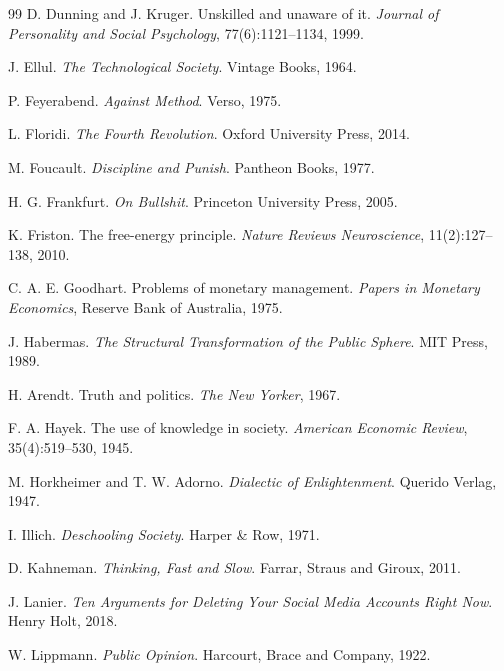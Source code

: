 \documentclass[12pt]{article}
\begin{document}
\begin{thebibliography}{99}
D. Dunning and J. Kruger.
\newblock Unskilled and unaware of it.
\newblock \emph{Journal of Personality and Social Psychology}, 77(6):1121--1134, 1999.

J. Ellul.
\newblock \emph{The Technological Society}.
\newblock Vintage Books, 1964.

P. Feyerabend.
\newblock \emph{Against Method}.
\newblock Verso, 1975.

L. Floridi.
\newblock \emph{The Fourth Revolution}.
\newblock Oxford University Press, 2014.

M. Foucault.
\newblock \emph{Discipline and Punish}.
\newblock Pantheon Books, 1977.

H. G. Frankfurt.
\newblock \emph{On Bullshit}.
\newblock Princeton University Press, 2005.

K. Friston.
\newblock The free-energy principle.
\newblock \emph{Nature Reviews Neuroscience}, 11(2):127--138, 2010.

C. A. E. Goodhart.
\newblock Problems of monetary management.
\newblock \emph{Papers in Monetary Economics}, Reserve Bank of Australia, 1975.

J. Habermas.
\newblock \emph{The Structural Transformation of the Public Sphere}.
\newblock MIT Press, 1989.

H. Arendt.
\newblock Truth and politics.
\newblock \emph{The New Yorker}, 1967.

F. A. Hayek.
\newblock The use of knowledge in society.
\newblock \emph{American Economic Review}, 35(4):519--530, 1945.

M. Horkheimer and T. W. Adorno.
\newblock \emph{Dialectic of Enlightenment}.
\newblock Querido Verlag, 1947.

I. Illich.
\newblock \emph{Deschooling Society}.
\newblock Harper \& Row, 1971.

D. Kahneman.
\newblock \emph{Thinking, Fast and Slow}.
\newblock Farrar, Straus and Giroux, 2011.

J. Lanier.
\newblock \emph{Ten Arguments for Deleting Your Social Media Accounts Right Now}.
\newblock Henry Holt, 2018.

W. Lippmann.
\newblock \emph{Public Opinion}.
\newblock Harcourt, Brace and Company, 1922.


\end{thebibliography}
\end{document}
